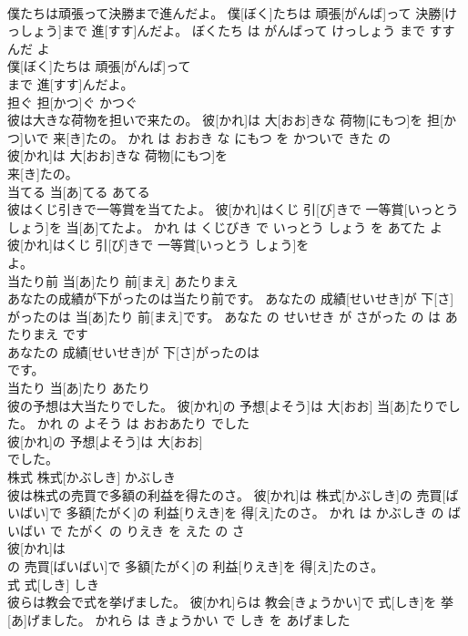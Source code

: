 \documentclass[8pt]{extreport}
\begin{document}
\begin{CJK}{UTF8}{min}
\\	僕たちは頑張って決勝まで進んだよ。	僕[ぼく]たちは 頑張[がんば]って 決勝[けっしょう]まで 進[すす]んだよ。	ぼくたち は がんばって けっしょう まで すすんだ よ	
\\	僕[ぼく]たちは 頑張[がんば]って
\\	まで 進[すす]んだよ。			
\\	担ぐ	担[かつ]ぐ	かつぐ	
\\	彼は大きな荷物を担いで来たの。	彼[かれ]は 大[おお]きな 荷物[にもつ]を 担[かつ]いで 来[き]たの。	かれ は おおき な にもつ を かついで きた の	
\\	彼[かれ]は 大[おお]きな 荷物[にもつ]を
\\	来[き]たの。			
\\	当てる	当[あ]てる	あてる	
\\	彼はくじ引きで一等賞を当てたよ。	彼[かれ]はくじ 引[び]きで 一等賞[いっとう しょう]を 当[あ]てたよ。	かれ は くじびき で いっとう しょう を あてた よ	
\\	彼[かれ]はくじ 引[び]きで 一等賞[いっとう しょう]を
\\	よ。			
\\	当たり前	当[あ]たり 前[まえ]	あたりまえ	
\\	あなたの成績が下がったのは当たり前です。	あなたの 成績[せいせき]が 下[さ]がったのは 当[あ]たり 前[まえ]です。	あなた の せいせき が さがった の は あたりまえ です	
\\	あなたの 成績[せいせき]が 下[さ]がったのは
\\	です。			
\\	当たり	当[あ]たり	あたり	
\\	彼の予想は大当たりでした。	彼[かれ]の 予想[よそう]は 大[おお] 当[あ]たりでした。	かれ の よそう は おおあたり でした	
\\	彼[かれ]の 予想[よそう]は 大[おお]
\\	でした。			
\\	株式	株式[かぶしき]	かぶしき	
\\	彼は株式の売買で多額の利益を得たのさ。	彼[かれ]は 株式[かぶしき]の 売買[ばいばい]で 多額[たがく]の 利益[りえき]を 得[え]たのさ。	かれ は かぶしき の ばいばい で たがく の りえき を えた の さ	
\\	彼[かれ]は
\\	の 売買[ばいばい]で 多額[たがく]の 利益[りえき]を 得[え]たのさ。			
\\	式	式[しき]	しき	
\\	彼らは教会で式を挙げました。	彼[かれ]らは 教会[きょうかい]で 式[しき]を 挙[あ]げました。	かれら は きょうかい で しき を あげました	

\end{CJK}
\end{document}

